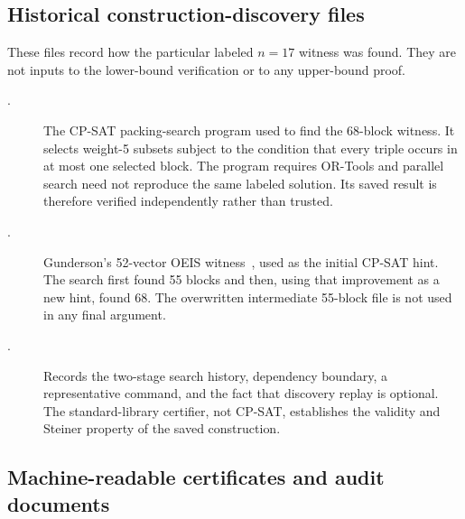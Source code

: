 \documentclass[11pt]{article}
\begin{document}
\subsection{Historical construction-discovery files}

These files record how the particular labeled $n=17$ witness was found.  They
are not inputs to the lower-bound verification or to any upper-bound proof.

\begin{description}
 \item[.]
 The CP-SAT packing-search program used to find the 68-block witness.  It
 selects weight-5 subsets subject to the condition that every triple occurs
 in at most one selected block.  The program requires OR-Tools and parallel
 search need not reproduce the same labeled solution.  Its saved result is
 therefore verified independently rather than trusted.

 \item[.]
 Gunderson's 52-vector OEIS witness~\cite{gunderson-a286874}, used as the
 initial CP-SAT hint.  The search first found 55 blocks and then, using that
 improvement as a new hint, found 68.  The overwritten intermediate 55-block
 file is not used in any final argument.

 \item[.]
 Records the two-stage search history, dependency boundary, a representative
 command, and the fact that discovery replay is optional.  The standard-library
 certifier, not CP-SAT, establishes the validity and Steiner property of the
 saved construction.
\end{description}

\subsection{Machine-readable certificates and audit documents}
\end{document}
